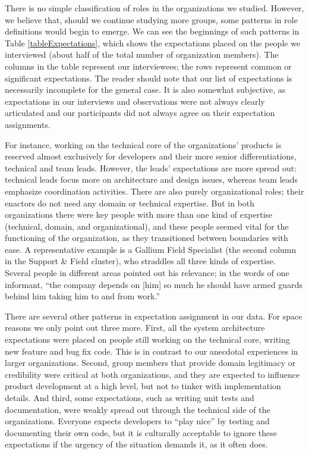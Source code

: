 \documentclass[10pt, conference, compsocconf]{IEEEtran}
\begin{document}
There is no simple classification of roles in the organizations we studied. However, we believe that, should we continue studying more groups, some patterns in role definitions would begin to emerge. We can see the beginnings of such patterns in Table \ref{tableExpectations}, which shows the expectations placed on the people we interviewed (about half of the total number of organization members). The columns in the table represent our interviewees; the rows represent common or significant expectations. The reader should note that our list of expectations is necessarily incomplete for the general case. It is also somewhat subjective, as expectations in our interviews and observations were not always clearly articulated and our participants did not always agree on their expectation assignments.

For instance, working on the technical core of the organizations' products is reserved almost exclusively for developers and their more senior differentiations, technical and team leads. However, the leads' expectations are more spread out: technical leads focus more on architecture and design issues, whereas team leads emphasize coordination activities. There are also purely organizational roles; their enactors do not need any domain or technical expertise. But in both organizations there were key people with more than one kind of expertise (technical, domain, and organizational), and these people seemed vital for the functioning of the organization, as they transitioned between boundaries with ease. A representative example is a Gallium Field Specialist (the second column in the Support \& Field cluster), who straddles all three kinds of expertise. Several people in different areas pointed out his relevance; in the words of one informant, ``the company depends on [him] so much he should have armed guards behind him taking him to and from work.''

There are several other patterns in expectation assignment in our data. For space reasons we only point out three more. First, all the system architecture expectations were placed on people still working on the technical core, writing new feature and bug fix code. This is in contrast to our anecdotal experiences in larger organizations. Second, group members that provide domain legitimacy or credibility were critical at both organizations, and they are expected to influence product development at a high level, but not to tinker with implementation details. And third, some expectations, such as writing unit tests and documentation, were weakly spread out through the technical side of the organizations. Everyone expects developers to ``play nice'' by testing and documenting their own code, but it is culturally acceptable to ignore these expectations if the urgency of the situation demands it, as it often does.
\end{document}
